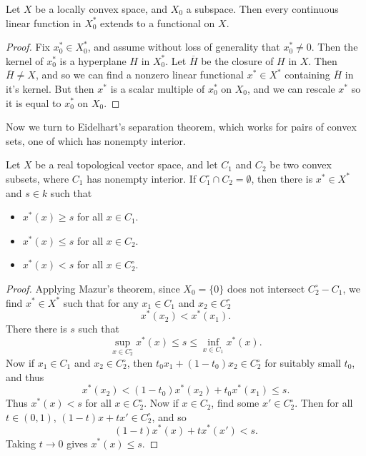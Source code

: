 \begin{corollary}
    Let $X$ be a locally convex space, and $X_0$ a subspace. Then every continuous linear function in $X_0^*$ extends to a functional on $X$.
\end{corollary}
\begin{proof}
    Fix $x_0^* \in X_0^*$, and assume without loss of generality that $x_0^* \neq 0$. Then the kernel of $x_0^*$ is a hyperplane $H$ in $X_0^*$. Let $\overline{H}$ be the closure of $H$ in $X$. Then $\overline{H} \neq X$, and so we can find a nonzero linear functional $x^* \in X^*$ containing $\overline{H}$ in it's kernel. But then $x^*$ is a scalar multiple of $x_0^*$ on $X_0$, and we can rescale $x^*$ so it is equal to $x_0^*$ on $X_0$.
\end{proof}

Now we turn to Eidelhart's separation theorem, which works for pairs of convex sets, one of which has nonempty interior.

\begin{theorem}
    Let $X$ be a real topological vector space, and let $C_1$ and $C_2$ be two convex subsets, where $C_1$ has nonempty interior. If $C_1^\circ \cap C_2 = \emptyset$, then there is $x^* \in X^*$ and $s \in k$ such that
    \begin{itemize}
        \item $x^*(x) \geq s$ for all $x \in C_1$.
        \item $x^*(x) \leq s$ for all $x \in C_2$.
        \item $x^*(x) < s$ for all $x \in C_2^\circ$.
    \end{itemize}
\end{theorem}
\begin{proof}
    Applying Mazur's theorem, since $X_0 = \{ 0 \}$ does not intersect $C_2^\circ - C_1$, we find $x^* \in X^*$ such that for any $x_1 \in C_1$ and $x_2 \in C_2^\circ$
    \[ x^*(x_2) < x^*(x_1). \]
    There there is $s$ such that
    \[ \sup_{x \in C_2^\circ} x^*(x) \leq s \leq \inf_{x \in C_1} x^*(x). \]
    Now if $x_1 \in C_1$ and $x_2 \in C_2^\circ$, then $t_0 x_1 + (1 - t_0) x_2 \in C_2^\circ$ for suitably small $t_0$, and thus
    \[ x^*(x_2) < (1 - t_0) x^*(x_2) + t_0 x^*(x_1) \leq s. \]
    Thus $x^*(x) < s$ for all $x \in C_2^\circ$. Now if $x \in C_2$, find some $x' \in C_2^\circ$. Then for all $t \in (0,1)$, $(1 - t)x + tx' \in C_2^\circ$, and so
    \[ (1 - t) x^*(x) + t x^*(x') < s. \]
    Taking $t \to 0$ gives $x^*(x) \leq s$.
\end{proof}

